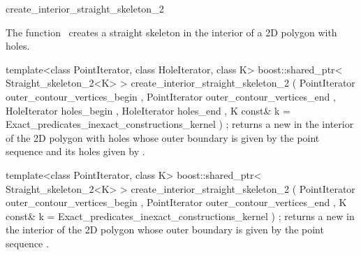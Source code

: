 

\begin{ccRefFunction}{create_interior_straight_skeleton_2}


\ccDefinition

The function \ccRefName\ creates a straight skeleton in the interior of a 2D polygon with holes.


\ccFunction
{template<class PointIterator, class HoleIterator, class K>
boost::shared_ptr< Straight_skeleton_2<K> >
create_interior_straight_skeleton_2 ( PointIterator outer_contour_vertices_begin
                                    , PointIterator outer_contour_vertices_end
                                    , HoleIterator  holes_begin
                                    , HoleIterator  holes_end
                                    , K const&      k = Exact_predicates_inexact_constructions_kernel
                                    ) ;
}
{returns a new  in the interior of the 2D polygon with holes whose outer boundary is given by the point sequence 
and its holes given by .
}

\ccFunction
{template<class PointIterator, class K>
boost::shared_ptr< Straight_skeleton_2<K> >
create_interior_straight_skeleton_2 ( PointIterator outer_contour_vertices_begin
                                    , PointIterator outer_contour_vertices_end
                                    , K const&      k = Exact_predicates_inexact_constructions_kernel
                                    ) ;
}
{returns a new  in the interior of the 2D polygon whose outer boundary is given by the point sequence .
}


\end{ccRefFunction}
